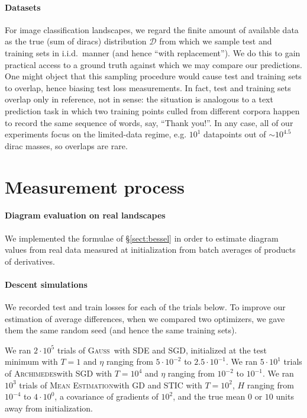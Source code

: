\documentclass[openany, notitlepage, justified]{tufte-book}
\theoremstyle{plain}
\theoremstyle{definition}
\newcommand{\Dd}{\mathcal{D}}
\newcommand{\Gauss}{\textsc{Gauss}}
\newcommand{\Archimedes}{\textsc{Archimedes}}
\newcommand{\MeanEstimation}{\textsc{Mean Estimation}}
\begin{document}
        \paragraph{Datasets}
            For image classification landscapes, we regard the finite amount of
            available data as the true (sum of diracs) distribution $\Dd$ from
            which we sample test and training sets in i.i.d.\ manner (and hence
            ``with replacement'').  We do this to gain practical access to a
            ground truth against which we may compare our predictions.  One
            might object that this sampling procedure would cause test and
            training sets to overlap, hence biasing test loss measurements.  In
            fact, test and training sets overlap only in reference, not in
            sense: the situation is analogous to a text prediction task in
            which two training points culled from different corpora happen to
            record the same sequence of words, say, ``Thank you!''.  In any
            case, all of our experiments focus on the limited-data regime, e.g.
            $10^1$ datapoints out of $\sim 10^{4.5}$ dirac masses, so overlaps
            are rare.

    \section{Measurement process}                                \label{appendix:measure}

        \paragraph{Diagram evaluation on real landscapes}
            We implemented the formulae of \S\ref{sect:bessel} in order
            to estimate diagram values from real data measured at
            initialization from batch averages of products of derivatives.

        \paragraph{Descent simulations}
            We recorded test and train losses for each of the trials below.  To
            improve our estimation of average differences, when we compared two
            optimizers, we gave them the same random seed (and hence the same
            training sets).

            We ran $2 \cdot 10^5$ trials of \Gauss\, with SDE and SGD,
            initialized at the test minimum with $T=1$ and $\eta$ ranging from
            $5\cdot 10^{-2}$ to $2.5\cdot 10^{-1}$.
            We ran $5 \cdot 10^1$ trials of \Archimedes with SGD with $T=10^4$
            and $\eta$ ranging from $10^{-2}$ to $10^{-1}$.
            We ran $10^3$ trials of \MeanEstimation with GD and STIC
            with $T=10^2$, $H$ ranging from $10^{-4}$ to $4 \cdot 10^0$,
            a covariance of gradients of $10^2$, and the true mean $0$ or
            $10$ units away from initialization.
\end{document}
